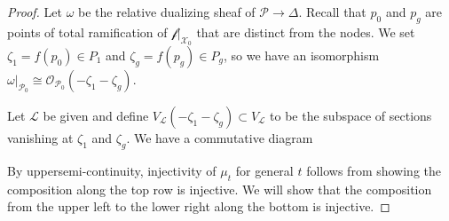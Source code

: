 \documentclass[12pt]{amsart}
\renewcommand{\P}{\mathcal{P}}
\renewcommand{\L}{\mathcal{L}}
\newcommand{\X}{\mathcal{X}}
\renewcommand{\O}{\mathscr{O}}
\renewcommand{\tilde}{\widetilde}
\newcommand{\f}{\mathcal{f}}
\theoremstyle{definition}
\theoremstyle{remark}
\theoremstyle{remark}
\numberwithin{equation}{section}
\begin{document}
\begin{proof}
Let $\omega$ be the relative dualizing sheaf of $\P \rightarrow \Delta$. 
 Recall that $p_0$ and $p_g$ are points of total ramification of $\f|_{\X_0}$ that are distinct from the nodes. We set $\zeta_1 = f(p_0) \in P_1$ and $\zeta_g = f(p_g) \in P_g$, so we have an isomorphism $\omega|_{\P_0} \cong \O_{\P_0}(-\zeta_1 - \zeta_g)$.

Let $\L$ be given and define $V_\L(-\zeta_1-\zeta_g) \subset V_\L$ to be the subspace of sections vanishing at $\zeta_1$ and $\zeta_g$.
We have a commutative diagram
\begin{center}
\end{center}
By uppersemi-continuity, injectivity of $\mu_t$ for general $t$ follows from showing the composition along the top row is injective. We will show that the composition from the upper left to the lower right along the bottom is injective.


\end{proof}
\end{document}
